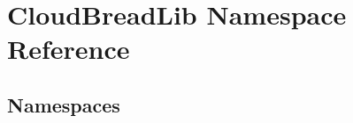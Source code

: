 \hypertarget{a00424}{}\section{Cloud\+Bread\+Lib Namespace Reference}
\label{a00424}
\subsection*{Namespaces}
\begin{DoxyCompactItemize}
\end{DoxyCompactItemize}
